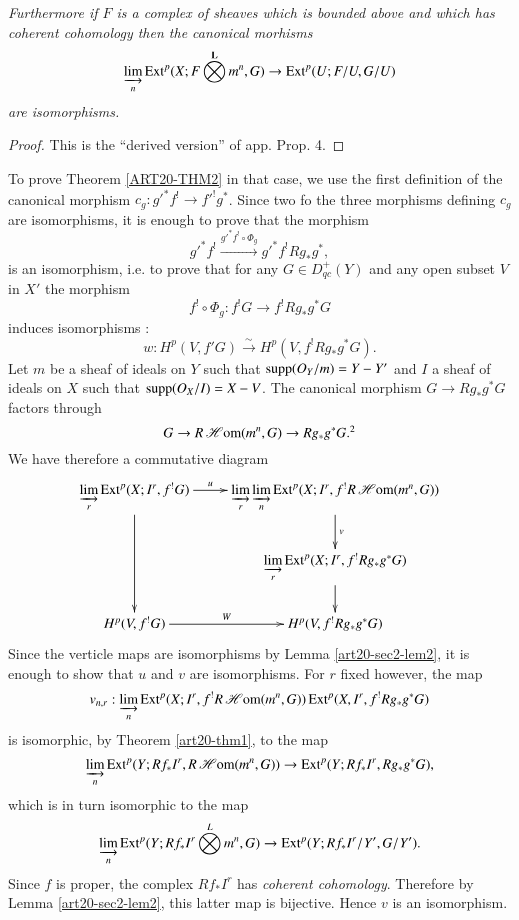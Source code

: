 {\em Furthermore if $F$ is a complex of sheaves which is bounded above and which has coherent cohomology then the canonical morhisms}
$$
\varinjlim_{n}\operatorname{\mathrm{Ext}}^{p}(X;F\bigotimes\limits^{\mathbf{L}}m^{n},G)\to \operatorname{\mathrm{Ext}}^{p}(U;F/U,G/U)
$$
{\em are isomorphisms.}
\smallskip

\begin{proof}
This is the ``derived version'' of \cite{art20-key1} app. Prop. 4.
\end{proof}

To prove Theorem \ref{ART20-THM2} in that case, we use the first definition of the canonical morphism $c_{g}:{g'}^{*}f^{!}\to {f'}^{!}g^{*}$. Since two fo the three morphisms defining $c_{g}$ are isomorphisms, it is enough to prove that the morphism
$$
{g'}^{*}f^{!}\xrightarrow{{g'}^{*}f^{!}\circ \Phi_{g}}{g'}^{*}f^{!}Rg_{*}g^{*},
$$
is an isomorphism, i.e. to prove that for any $G\in D^{+}_{qc}(Y)$ and any open subset $V$ in $X'$ the morphism
$$
f^{!}\circ \Phi_{g}:f^{!}G\to f^{!}Rg_{*}g^{*}G
$$
induces isomorphisms :
$$
w:H^{p}(V,{f'}G)\xrightarrow{\sim}H^{p}(V,f^{!}Rg_{*}g^{*}G).
$$
Let $m$ be a sheaf of ideals on $Y$ such that $\operatorname{\mathrm{supp}}(O_{Y}/m)=Y-Y'$ and $I$ a sheaf of ideals on $X$ such that $\operatorname{\mathrm{supp}}(O_{X}/I)=X-V$. The canonical morphism $G\to Rg_{*}g^{*}G$ factors through
$$
G\to R\scrHom(m^{n},G)\to Rg_{*}g^{*}G.\footnotemark[2]
$$
We have therefore a commutative diagram
\[
\xymatrix{
\varinjlim\limits_{r}\Ext^{p}(X;I^{r},f^{!}G)\ar[dd]\ar[r]^-{u} & \varinjlim\limits_{r}\varinjlim\limits_{n}\Ext^{p}(X;I^{r},f^{!}R\scrHom(m^{n},G))\ar[d]^-{v}\\
 & \varinjlim\limits_{r}\Ext^{p}(X;I^{r},f^{!}Rg_{*}g^{*}G)\ar[d]\\
H^{p}(V,f^{!}G)\ar[r]^-{W} & H^{p}(V,f^{!}Rg_{*}g^{*}G)
}
\]\pageoriginale
Since the verticle maps are isomorphisms by Lemma \ref{art20-sec2-lem2}, it is enough to show that $u$ and $v$ are isomorphisms. For $r$ fixed however, the map
$$
v_{n,r}:\varinjlim_{n}\operatorname{\mathrm{Ext}}^{p}(X;I^{r},f^{!}R\operatorname{\mathscr{H}\mathrm{om}}(m^{n},G))\operatorname{\mathrm{Ext}}^{p}(X,I^{r},f^{!}Rg_{*}g^{*}G)
$$
is isomorphic, by Theorem \ref{art20-thm1}, to the map
$$
\varinjlim_{n}\operatorname{\mathrm{Ext}}^{p}(Y;Rf_{*}I^{r},R\operatorname{\mathscr{H}\mathrm{om}}(m^{n},G))\to \operatorname{\mathrm{Ext}}^{p}(Y;Rf_{*}I^{r},Rg_{*}g^{*}G),
$$
which is in turn isomorphic to the map
$$
\varinjlim_{n}\operatorname{\mathrm{Ext}}^{p}(Y;Rf_{*}I^{r}\bigotimes\limits^{L}m^{n},G)\to \operatorname{\mathrm{Ext}}^{p}(Y;Rf_{*}I^{r}/Y',G/Y').
$$
Since $f$ is proper, the complex $Rf_{*}I^{r}$ has {\em coherent cohomology}. Therefore by Lemma \ref{art20-sec2-lem2}, this latter map is bijective. Hence $v$ is an isomorphism.


